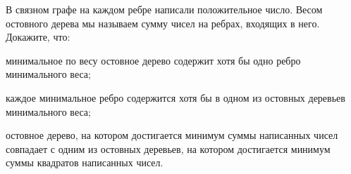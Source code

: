 В связном графе на каждом ребре написали положительное число. Весом остовного дерева мы называем сумму чисел на ребрах,
входящих в него. Докажите, что:
\begin{enumcyr}
    \item минимальное по весу остовное дерево содержит хотя бы одно ребро минимального веса;
    \item каждое минимальное ребро содержится хотя бы в одном из остовных деревьев минимального веса;
    \item остовное дерево, на котором достигается минимум суммы написанных чисел совпадает с одним из остовных деревьев, на
	    котором достигается минимум суммы квадратов написанных чисел.
\end{enumcyr}